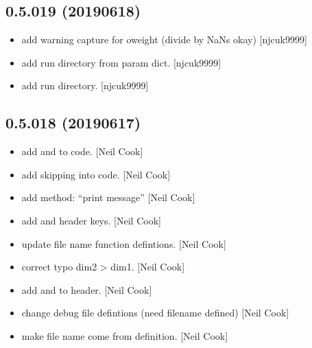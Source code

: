 \documentclass[a4paper,10pt,english]{report}
\begin{document}
\subsection{0.5.019 (2019\sphinxhyphen{}06\sphinxhyphen{}18)}
\label{\detokenize{misc/changelog:id136}}\begin{itemize}
\item {} 
 \sphinxhyphen{} add warning capture for oweight (divide by NaNs okay)
{[}njcuk9999{]}

\item {} 
 \sphinxhyphen{} add run directory from param dict. {[}njcuk9999{]}

\item {} 
 \sphinxhyphen{} add run directory. {[}njcuk9999{]}

\end{itemize}


\subsection{0.5.018 (2019\sphinxhyphen{}06\sphinxhyphen{}17)}
\label{\detokenize{misc/changelog:id137}}\begin{itemize}
\item {} 
 \sphinxhyphen{} add  and  to code. {[}Neil Cook{]}

\item {} 
 \sphinxhyphen{} add skipping into code. {[}Neil Cook{]}

\item {} 
 \sphinxhyphen{} add method: “print message” {[}Neil Cook{]}

\item {} 
 \sphinxhyphen{} add  and  header keys. {[}Neil Cook{]}

\item {} 
 \sphinxhyphen{} update file name function defintions. {[}Neil Cook{]}

\item {} 
 \sphinxhyphen{} correct typo dim2 \textendash{}\textgreater{} dim1. {[}Neil Cook{]}

\item {} 
 \sphinxhyphen{} add  and  to header. {[}Neil Cook{]}

\item {} 
 \sphinxhyphen{} change debug file defintions (need filename
defined) {[}Neil Cook{]}

\item {} 
 \sphinxhyphen{} make file name come from definition. {[}Neil
Cook{]}

\end{itemize}
\end{document}
